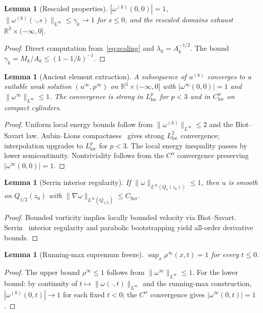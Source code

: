 \documentclass[12pt, reqno]{amsart}
\newtheorem{lemma}[theorem]{Lemma}
\theoremstyle{definition}
\theoremstyle{remark}
\numberwithin{equation}{section}
\newcommand{\R}{\mathbb{R}}
\begin{document}
\begin{lemma}[Rescaled properties]\label{lem:rescaled}
$|\omega^{(k)}(0,0)|=1$,\quad
$\|\omega^{(k)}(\cdot,s)\|_{L^\infty}\le\gamma_k\to 1$
for $s\le 0$,\quad
and the rescaled domains exhaust $\R^3\times(-\infty,0]$.
\end{lemma}
\begin{proof}
Direct computation from~\eqref{eq:scaling} and
$\lambda_k=A_k^{-1/2}$.  The bound $\gamma_k=M_k/A_k\le(1-1/k)^{-1}$.
\end{proof}

\begin{lemma}[Ancient element extraction]\label{lem:ancient}
A subsequence of $u^{(k)}$ converges to a suitable weak solution
$(u^\infty,p^\infty)$ on $\R^3\times(-\infty,0]$ with
$|\omega^\infty(0,0)|=1$ and $\|\omega^\infty\|_{L^\infty}\le 1$.
The convergence is strong in $L^p_{\mathrm{loc}}$ for $p<3$ and in
$C^\alpha_{\mathrm{loc}}$ on compact cylinders.
\end{lemma}
\begin{proof}
Uniform local energy bounds follow from $\|\omega^{(k)}\|_{L^\infty}\le 2$
and the Biot--Savart law.  Aubin--Lions compactness~\cite{Aubin1963,Lions1969}
gives strong $L^2_{\mathrm{loc}}$ convergence; interpolation upgrades
to $L^p_{\mathrm{loc}}$ for $p<3$.  The local energy inequality passes by
lower semicontinuity.  Nontriviality follows from the $C^\alpha$ convergence
preserving $|\omega^\infty(0,0)|=1$.
\end{proof}

\begin{lemma}[Serrin interior regularity]\label{lem:serrin}
If $\|\omega\|_{L^\infty(Q_1(z_0))}\le 1$, then $u$ is smooth on
$Q_{1/2}(z_0)$ with $\|\nabla\omega\|_{L^\infty(Q_{1/2})}\le C_{\mathrm{Ser}}$.
\end{lemma}
\begin{proof}
Bounded vorticity implies locally bounded velocity via Biot--Savart.
Serrin~\cite{Serrin1962} interior regularity and parabolic bootstrapping
yield all-order derivative bounds.
\end{proof}

\begin{lemma}[Running-max supremum freeze]\label{lem:sup-freeze}
$\sup_{x}\rho^\infty(x,t)=1$ for every $t\le 0$.
\end{lemma}
\begin{proof}
The upper bound $\rho^\infty\le 1$ follows from
$\|\omega^\infty\|_{L^\infty}\le 1$.  For the lower bound:
by continuity of $t\mapsto\|\omega(\cdot,t)\|_{L^\infty}$ and the
running-max construction, $|\omega^{(k)}(0,t)|\to 1$ for each fixed
$t<0$; the $C^\alpha$ convergence gives $|\omega^\infty(0,t)|=1$.
\end{proof}
\end{document}
